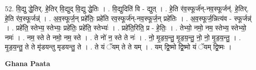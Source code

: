 \documentclass[17pt]{extarticle}
\begin{document}
52. वि॒द्यु द्धे॒तिर्. हे॒तिर् वि॒द्युद् वि॒द्यु द्धे॒तिः । . वि॒द्युदिति॑ वि - द्युत् । . हे॒ति र॑व॒स्फूर्ज॑न्-नव॒स्फूर्जन्॑. हे॒तिर्. हे॒ति र॑व॒स्फूर्जन्न्॑ । . अ॒व॒स्फूर्ज॒न् प्रहे॑तिः॒ प्रहे॑ति रव॒स्फूर्ज॑न्-नव॒स्फूर्ज॒न् प्रहे॑तिः । . अ॒व॒स्फूर्ज॒न्नित्य॑व - स्फूर्जन्न्॑ । . प्रहे॑ति॒ स्तेभ्य॒ स्तेभ्यः॒ प्रहे॑तिः॒ प्रहे॑ति॒ स्तेभ्यः॑ । . प्रहे॑ति॒रिति॒ प्र - हे॒तिः॒ । . तेभ्यो॒ नमो॒ नम॒ स्तेभ्य॒ स्तेभ्यो॒ नमः॑ । . नम॒ स्ते ते नमो॒ नम॒ स्ते । . ते नो॑ न॒ स्ते ते नः॑ । . नो॒ मृ॒ड॒य॒न्तु॒ मृ॒ड॒य॒न्तु॒ नो॒ नो॒ मृ॒ड॒य॒न्तु॒ । . मृ॒ड॒य॒न्तु॒ ते ते मृ॑डयन्तु मृडयन्तु॒ ते । . ते यं ॅयम् ते ते यम् । . यम् द्वि॒ष्मो द्वि॒ष्मो यं ॅयम् द्वि॒ष्मः । \newline

\textbf{Ghana Paata } \newline
\end{document}
